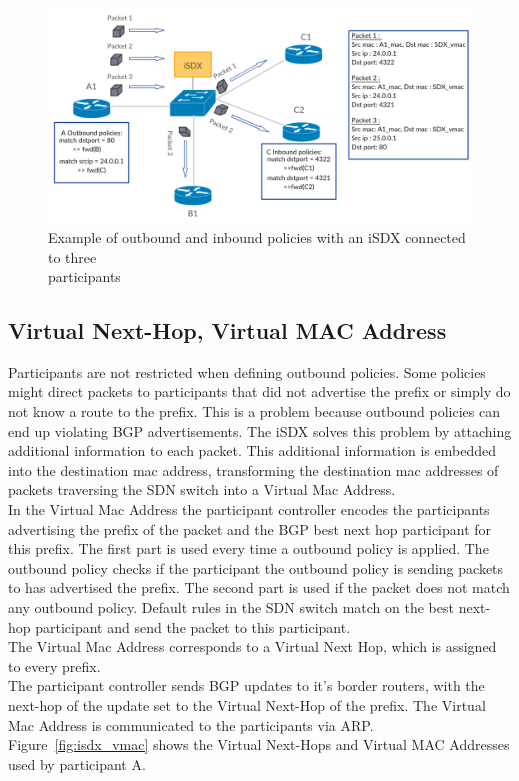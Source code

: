 \begin{figure}[h]
\includegraphics[scale = 0.32]{Figures/bckgrnd_sdx_policies.pdf}
\caption{Example of outbound and inbound policies with an iSDX connected to three \\ participants}
\label{fig:isdx_policies}
\end{figure}
  

\subsection{\label{chapter2:iSDX:virtual next-hop, virtual mac address}Virtual Next-Hop, Virtual MAC Address}


Participants are not restricted when defining outbound policies. Some policies might direct packets to participants that did not advertise the prefix or simply do not know a route to the prefix. This is a problem because outbound policies can end up violating BGP advertisements. The iSDX solves this problem by attaching additional information to each packet. This additional information is embedded into the destination mac address, transforming the destination mac addresses of packets traversing the SDN switch into a Virtual Mac Address. \\ 
In the Virtual Mac Address the participant controller encodes the participants advertising the prefix of the packet and the BGP best next hop participant for this prefix. The first part is used every time a outbound policy is applied. The outbound policy checks if the participant the outbound policy is sending packets to has advertised the prefix. The second part is used if the packet does not match any outbound policy. Default rules in the SDN switch match on the best next-hop participant and send the packet to this participant. \\
The Virtual Mac Address corresponds to a Virtual Next Hop, which is assigned to every prefix. \\ The participant controller sends BGP updates to it's border routers, with the next-hop of the update set to the Virtual Next-Hop of the prefix. The Virtual Mac Address is communicated to the participants via ARP. \\
Figure~\ref{fig:isdx_vmac} shows the Virtual Next-Hops and Virtual MAC Addresses used by participant A.

